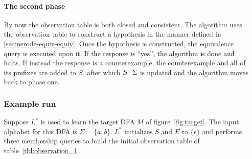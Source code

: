 \paragraph{The second phase} By now the observation table is both closed and
consistent. The algorithm uses the observation table to construct a hypothesis
in the manner defined in \cref{sec:nerode-equiv-equiv}. Once the hypothesis is
constructed, the equivalence query is executed upon it. If the response is
``yes'', the algorithm is done and halts. If instead the response is a
counterexample, the counterexample and all of its prefixes are added to $S$,
after which $S \cdot \Sigma$ is updated and the algorithm moves back to phase
one.

\subsubsection{Example run}
\label{sec:example-run}
Suppose $L^*$ is used to learn the target DFA $M$ of figure~\ref{fig:target}.
The input alphabet for this DFA is $\Sigma = \{a, b\}$. $L^*$ initializes $S$
and $E$ to $\{\epsilon\}$ and performs three membership queries to build the
initial observation table of table~\ref{tbl:observation_1}.

